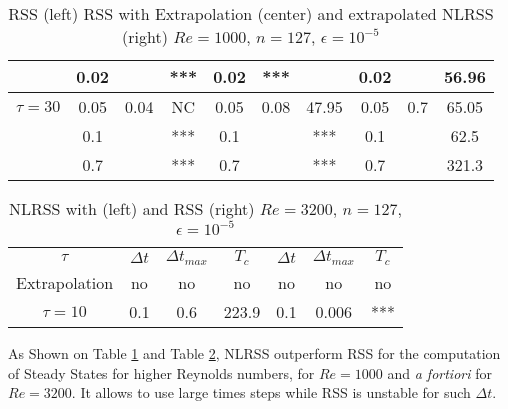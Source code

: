 {\begin{table}[ht!]
\begin{center}
\begin{tabular}{|c||c|c|c||c|c|c||c|c|c|}
                  &  0.02       &        &   ***  &     0.02      & ***       &    & 0.02 &   & 56.96 \\ 
\hline 
\hline  
$\tau = 30$     &0.05 &0.04 & NC  &       0.05&0.08&47.95&  0.05 & 0.7 & 65.05 \\ 
\hline
                     & 0.1   &      &***&  0.1&&***&0.1 &   & 62.5 \\ 
\hline
                     & 0.7   &      &*** &0.7   &&*** &  0.7 &   & 321.3 \\ 
\hline 
\end{tabular}
\caption{RSS (left)   RSS with   Extrapolation (center) and extrapolated NLRSS  (right) $Re=1000$, $n=127$, $\epsilon=10^{-5}$}
\label{tab6}
\end{center}
\end{table}
\begin{table}[ht!]
\begin{center}
\begin{tabular}{|c||c|c|c||c|c|c|}
\hline
$\tau$ & $\Delta t$ & $\Delta t_{max}$ & $T_c$ & $\Delta t$ & $\Delta t_{max}$ & $T_c$\\
Extrapolation & no  & no  & no  & no& no& no\\
\hline
$\tau = 10$    & 0.1 &  0.6 & 223.9 &  0.1& 0.006 & ***\\ 
\hline
\end{tabular}
\caption{NLRSS with (left)  and RSS  (right) $Re=3200$, $n=127$, $\epsilon=10^{-5}$}
\label{tab7}
\end{center}
\end{table}

As Shown on Table \ref{tab6} and Table \ref{tab7}, NLRSS outperform RSS for the computation of  Steady States for higher Reynolds numbers, for $Re=1000$ and {\it a fortiori} for $Re=3200$. It allows to use large times steps while RSS is  unstable for such $\Delta t$.
}
